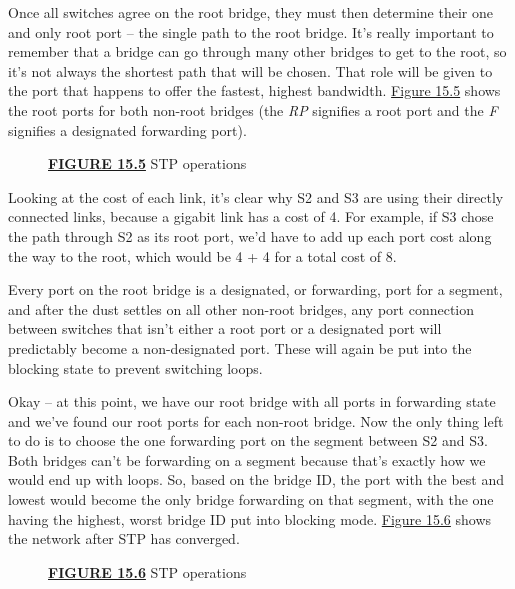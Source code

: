 \documentclass[b5paper,11pt]{memoir}
\begin{document}
Once all switches agree on the root bridge, they must then determine
their one and only root port -- the single path to the root bridge. It's
really important to remember that a bridge can go through many other
bridges to get to the root, so it's not always the shortest path that
will be chosen. That role will be given to the port that happens to
offer the fastest, highest bandwidth.
\protect\hyperlink{c15.xhtmlux5cux23figure15-5}{Figure 15.5} shows the
root ports for both non-root bridges (the \emph{RP} signifies a root
port and the \emph{F} signifies a designated forwarding port).



\begin{figure}
\centering
\caption{{\protect\hyperlink{c15.xhtmlux5cux23figureanchor15-5}{\textbf{FIGURE
15.5}} STP operations}}
\end{figure}

Looking at the cost of each link, it's clear why S2 and S3 are using
their directly connected links, because a gigabit link has a cost of 4.
For example, if S3 chose the path through S2 as its root port, we'd have
to add up each port cost along the way to the root, which would be 4 + 4
for a total cost of 8.

Every port on the root bridge is a designated, or forwarding, port for a
segment, and after the dust settles on all other non-root bridges, any
port connection between switches that isn't either a root port or a
designated port will predictably become a non-designated port. These
will again be put into the blocking state to prevent switching loops.

Okay -- at this point, we have our root bridge with all ports in
forwarding state and we've found our root ports for each non-root
bridge. Now the only thing left to do is to choose the one forwarding
port on the segment between S2 and S3. Both bridges can't be forwarding
on a segment because that's exactly how we would end up with loops. So,
based on the bridge ID, the port with the best and lowest would become
the only bridge forwarding on that segment, with the one having the
highest, worst bridge ID put into blocking mode.
\protect\hyperlink{c15.xhtmlux5cux23figure15-6}{Figure 15.6} shows the
network after STP has converged.

\begin{figure}
\centering
\caption{{\protect\hyperlink{c15.xhtmlux5cux23figureanchor15-6}{\textbf{FIGURE
15.6}} STP operations}}
\end{figure}
\end{document}
